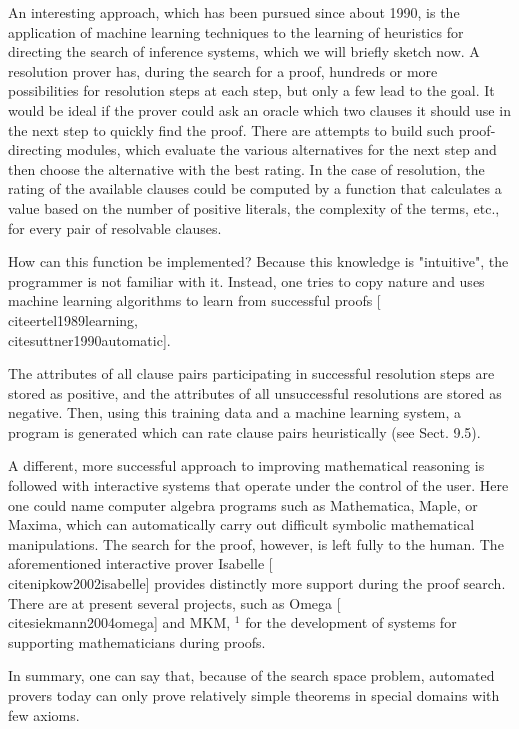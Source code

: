 \documentclass[10pt]{book}
\begin{document}
An interesting approach, which has been pursued since about 1990, is the application of machine learning techniques to the learning of heuristics for directing the search of inference systems, which we will briefly sketch now. A resolution prover has, during the search for a proof, hundreds or more possibilities for resolution steps at each step, but only a few lead to the goal. It would be ideal if the prover could ask an oracle which two clauses it should use in the next step to quickly find the proof. There are attempts to build such proof-directing modules, which evaluate the various alternatives for the next step and then choose the alternative with the best rating. In the case of resolution, the rating of the available clauses could be computed by a function that calculates a value based on the number of positive literals, the complexity of the terms, etc., for every pair of resolvable clauses.

How can this function be implemented? Because this knowledge is "intuitive", the programmer is not familiar with it. Instead, one tries to copy nature and uses machine learning algorithms to learn from successful proofs [\\cite{ertel1989learning}, \\cite{suttner1990automatic}].

The attributes of all clause pairs participating in successful resolution steps are stored as positive, and the attributes of all unsuccessful resolutions are stored as negative. Then, using this training data and a machine learning system, a program is generated which can rate clause pairs heuristically (see Sect. 9.5).

A different, more successful approach to improving mathematical reasoning is followed with interactive systems that operate under the control of the user. Here one could name computer algebra programs such as Mathematica, Maple, or Maxima, which can automatically carry out difficult symbolic mathematical manipulations. The search for the proof, however, is left fully to the human. The aforementioned interactive prover Isabelle [\\cite{nipkow2002isabelle}] provides distinctly more support during the proof search. There are at present several projects, such as Omega [\\cite{siekmann2004omega}] and MKM, ${ }^{1}$ for the development of systems for supporting mathematicians during proofs.

In summary, one can say that, because of the search space problem, automated provers today can only prove relatively simple theorems in special domains with few axioms.
\end{document}
